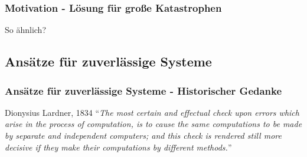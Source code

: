 \begin{frame}
	\frametitle{Motivation - Lösung für große Katastrophen}

	\begin{center}
		{\huge So ähnlich?}
	\end{center}
\end{frame}
%
%
%
\subsection{Ansätze für zuverlässige Systeme}
\begin{frame}
	\frametitle{Ansätze für zuverlässige Systeme - Historischer Gedanke}
	\begin{block}{Dionysius Lardner, 1834 \cite{lardner}}
		\enquote{\emph{The most certain and effectual check upon errors which arise in the process of computation,	is to cause the same computations to be made by separate and independent computers; and this	check is rendered still more decisive if they make their computations by different methods.}} 
	\end{block}
	
	
\end{frame}